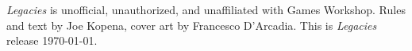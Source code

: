 
\noindent\emph{Legacies} is unofficial, unauthorized, and unaffiliated with
Games Workshop.  Rules and text by Joe Kopena, cover art by Francesco
D'Arcadia.  This is \emph{Legacies} release \today.

\endinput

\begin{columns}

\subsection{Version}



\subsection{Credits}%

\hspace{2em}{\bf Design \& Text:} 

\noindent\hspace{2em}{\bf Cover Art:} 




\vfill
\columnbreak
\subsection{Disclaimer}%




\end{columns}

